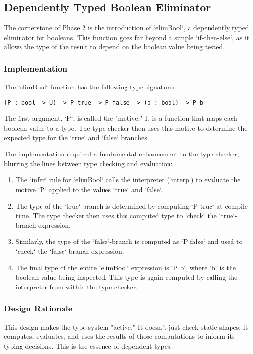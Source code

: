 \subsection{Dependently Typed Boolean Eliminator}

The cornerstone of Phase 2 is the introduction of `elimBool`, a dependently typed eliminator for booleans. This function goes far beyond a simple `if-then-else`, as it allows the type of the result to depend on the boolean value being tested.

\subsubsection{Implementation}
The `elimBool` function has the following type signature:
\begin{verbatim}
(P : bool -> U) -> P true -> P false -> (b : bool) -> P b
\end{verbatim}
The first argument, `P`, is called the "motive." It is a function that maps each boolean value to a type. The type checker then uses this motive to determine the expected type for the `true` and `false` branches.

The implementation required a fundamental enhancement to the type checker, blurring the lines between type checking and evaluation:
\begin{enumerate}
    \item The `infer` rule for `elimBool` calls the interpreter (`interp`) to evaluate the motive `P` applied to the values `true` and `false`.
    \item The type of the `true`-branch is determined by computing `P true` at compile time. The type checker then uses this computed type to `check` the `true`-branch expression.
    \item Similarly, the type of the `false`-branch is computed as `P false` and used to `check` the `false`-branch expression.
    \item The final type of the entire `elimBool` expression is `P b`, where `b` is the boolean value being inspected. This type is again computed by calling the interpreter from within the type checker.
\end{enumerate}

\subsubsection{Design Rationale}
This design makes the type system "active." It doesn't just check static shapes; it computes, evaluates, and uses the results of those computations to inform its typing decisions. This is the essence of dependent types.

